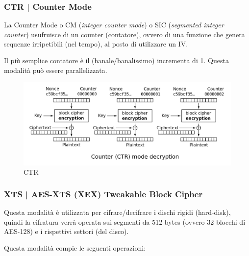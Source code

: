 \subsubsection{CTR | Counter Mode}

 

\textsf{\small La Counter Mode o CM (\emph{integer counter mode}) o SIC (\emph{segmented integer counter}) usufruisce di un counter (contatore), ovvero di una funzione che genera sequenze irripetibili (nel tempo), al posto di utilizzare un IV.}

\textsf{\small Il più semplice contatore è il (banale/banalissimo) incrementa di 1.}
\textsf{\small Questa modalità può essere parallelizzata.}

\begin{figure}[H]
	\centering
	\includegraphics[width=1\textwidth, height=1\textheight, keepaspectratio]{./images/aes_modes/ctr.png}
	\caption{CTR}
	\label{fig:ctr}
\end{figure}

\subsubsection{XTS | AES-XTS (XEX) Tweakable Block Cipher}

 

\textsf{\small Questa modalità è utilizzata per cifrare/decifrare i dischi rigidi (hard-disk), quindi la cifratura verrà operata sui segmenti da 512 bytes (ovvero 32 blocchi di AES-128) e i rispettivi settori (del disco).}


\textsf{\small Questa modalità compie le seguenti operazioni: } %

 


